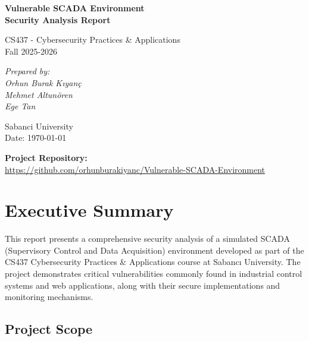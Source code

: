 \documentclass[12pt,a4paper]{article}
\begin{document}
\begin{titlepage}
    \centering
    \vspace*{2cm}
    
    {\Huge\bfseries Vulnerable SCADA Environment\\[0.5cm] Security Analysis Report\par}
    \vspace{1.5cm}
    
    {\Large CS437 - Cybersecurity Practices \& Applications \\[0.3cm]
    Fall 2025-2026\par}
    \vspace{2cm}
    
    {\Large\itshape Prepared by:\\[0.5cm]
    Orhun Burak Kıyanç \\ Mehmet Altunören \\
    Ege Tan\par}
    \vspace{5cm}
    
    {\Large Sabanci University \\Date: \today\par}
    \vspace{2cm}
       
    
    \vfill
    
    {\large \textbf{Project Repository:}\\
    \url{https://github.com/orhunburakiyanc/Vulnerable-SCADA-Environment}\par}
    
\end{titlepage}

\tableofcontents
\newpage

\section{Executive Summary}

This report presents a comprehensive security analysis of a simulated SCADA (Supervisory Control and Data Acquisition) environment developed as part of the CS437 Cybersecurity Practices \& Applications course at Sabancı University. The project demonstrates critical vulnerabilities commonly found in industrial control systems and web applications, along with their secure implementations and monitoring mechanisms.

\subsection{Project Scope}
\end{document}
